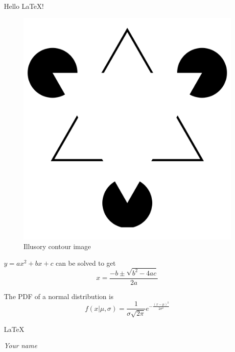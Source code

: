 \documentclass{article} %
\begin{document}
Hello \LaTeX!

\begin{figure}[h]
\centering
\includegraphics[width=.5\textwidth]{../image/IllusoryContour.png}
\caption{Illusory contour image}
\end{figure}

$y = ax^2 + bx + c$ can be solved to get $$x = \frac{-b \pm \sqrt{b^2 - 4ac}}{2a}$$

The PDF of a normal distribution is $$f(x | \mu, \sigma) = \frac{1}{\sigma\sqrt{2\pi}} e^{-\frac{(x - \mu)^2}{2\sigma^2}}$$


\Huge\LaTeX


\tiny\emph{Your name}
\end{document}
